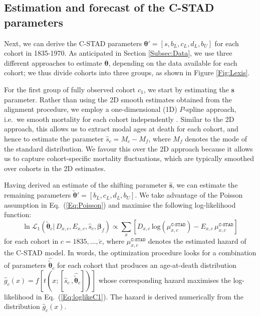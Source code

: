 \documentclass[11pt, a4paper]{article}
\begin{document}
\subsection{Estimation and forecast of the C-STAD parameters}
\label{Subsec:EstimForeC-STAD}
Next, we can derive the C-STAD parameters $\bm{\theta}'=\left[s,b_{L},c_{L},d_{L},b_{U}\right]$ for each cohort in 1835-1970. As anticipated in Section \ref{Subsec:Data}, we use three different approaches to estimate $\bm{\theta}$, depending on the data available for each cohort; we thus divide cohorts into three groups, as shown in Figure \ref{Fig:Lexis}. 

For the first group of fully observed cohort $c_1$, we start by estimating the $\bm{s}$ parameter. Rather than using the 2D smooth estimates obtained from the alignment procedure, we employ a one-dimensional (1D) $P$-spline approach, i.e.~we smooth mortality for each cohort independently \cite[as typically done in period analyses, see, for example,][]{ouellette2011changes}. Similar to the 2D approach, this allows us to extract modal ages at death for each cohort, and hence to estimate the parameter $\hat{s}_c=M_c - M_f$, where $M_f$ denotes the mode of the standard distribution. We favour this over the 2D approach because it allows us to capture cohort-specific mortality fluctuations, which are typically smoothed over cohorts in the 2D estimates. \par

Having derived an estimate of the shifting parameter $\hat{\bm{s}}$, we can estimate the remaining parameters $\tilde{\bm{\theta}}'=\left[b_{L},c_{L},d_{L},b_{U}\right]$. We take advantage of the Poisson assumption in Eq.~(\ref{Eq:Poisson}) and maximise the following log-likelihood function:
%
\begin{equation}\label{Eq:loglikeC1}
\ln\mathcal{L}_1\left(\tilde{\bm{\theta}}_c | \, D_{x,c} , E_{x,c} , \hat{s}_{c}, \bm{\beta}_{f}
\right) \propto \sum_{x} \left[  D_{x,c} \,
\mathrm{log} \left( \mu^{\texttt{C-STAD}}_{x,c}  \right) - E_{x,c}
\, \mu^{\texttt{C-STAD}}_{x,c} \right] 
\end{equation}
%
for each cohort in $c=1835,\ldots,\breve{c}$, where $\mu^{\texttt{C-STAD}}_{x,c}$ denotes
the estimated hazard of the C-STAD model. In words, the optimization procedure looks for a combination of parameters $\hat{\tilde{\bm{\theta}}}_c$ for each cohort that produces an age-at-death distribution $\hat{g}_c(x)=f\left[t\left(x;\left[ \hat{s}_{c} \,, \hat{\tilde{\bm{\theta}}}_c\right]\right)\right]$ whose corresponding hazard maximises the log-likelihood in Eq.~(\ref{Eq:loglikeC1}). The hazard is derived numerically from the distribution $\hat{g}_c(x)$.
\end{document}
